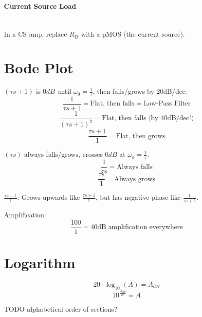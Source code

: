 \documentclass[twocolumn]{article}
\begin{document}
    \paragraph{Current Source Load} \hfill \\
      In a CS amp, replace $R_D$ with a pMOS (the current source).
  \section{Bode Plot}
    $(\tau s + 1)$ is $0dB$ until $\omega_0 = \frac{1}{\tau}$, then falls/grows
    by 20dB/dec.
    $$\frac{1}{\tau s + 1} = \text{Flat, then falls} = \text{Low-Pass Filter}$$
    $$\frac{1}{(\tau s + 1)^2} = \text{Flat, then falls (by 40dB/dec!)}$$
    $$\frac{\tau s + 1}{1} = \text{Flat, then grows}$$

    $(\tau s)$ always falls/grows, crosses $0dB$ at $\omega_o = \frac{1}{\tau}$.
    $$\frac{1}{\tau s} = \text{Always falls}$$
    $$\frac{\tau s}{1} = \text{Always grows}$$

    $\frac{\tau s - 1}{1}$:
    Grows upwards like $\frac{\tau s + 1}{1}$, but has negative phase like
    $\frac{1}{\tau s + 1}$.

    Amplification:
    $$\frac{100}{1} = \text{40dB amplification everywhere}$$
  \section{Logarithm}
    $$20 \cdot \log_{10}(A) = A_{dB}$$
    $$10^{\frac{A_{dB}}{20}} = A$$

  TODO alphabetical order of sections?
\end{document}
